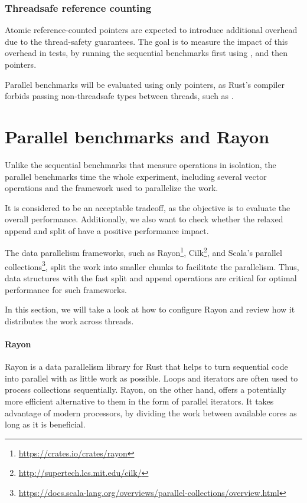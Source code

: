 \subsubsection*{Threadsafe reference counting}
Atomic reference-counted pointers are expected to introduce additional overhead due to the thread-safety guarantees. The goal is to measure the impact of this overhead in tests, by running the sequential benchmarks first using \rc{}, and then \arc{} pointers.

Parallel benchmarks will be evaluated using only \arc{} pointers, as Rust's compiler forbids passing non-threadsafe types between threads, such as \rc{}.

\section{Parallel benchmarks and Rayon}
Unlike the sequential benchmarks that measure operations in isolation, the parallel benchmarks time the whole experiment, including several vector operations and the framework used to parallelize the work. 

It is considered to be an acceptable tradeoff, as the objective is to evaluate the overall performance. Additionally, we also want to check whether the relaxed append and split of \rrbvec{} have a positive performance impact.

The data parallelism frameworks, such as Rayon\footnote{\url{https://crates.io/crates/rayon}}, Cilk\footnote{\url{http://supertech.lcs.mit.edu/cilk/}}, and Scala's parallel collections\footnote{\url{https://docs.scala-lang.org/overviews/parallel-collections/overview.html}}, split the work into smaller chunks to facilitate the parallelism. Thus, data structures with the fast split and append operations are critical for optimal performance for such frameworks.

In this section, we will take a look at how to configure Rayon and review how it distributes the work across threads. 

\paragraph{Rayon}
Rayon is a data parallelism library for Rust that helps to turn sequential code into parallel with as little work as possible. Loops and iterators are often used to process collections sequentially. Rayon, on the other hand, offers a potentially more efficient alternative to them in the form of parallel iterators. It takes advantage of modern processors, by dividing the work between available cores as long as it is beneficial.

